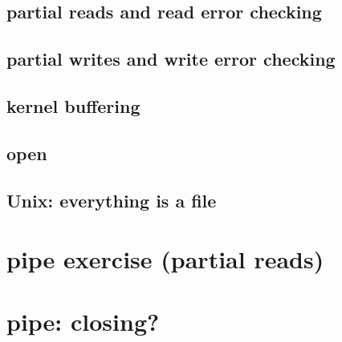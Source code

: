 \subsection{partial reads and read error checking}

\subsection{partial writes and write error checking}


\subsection{kernel buffering}



\subsection{open}


\subsection{Unix: everything is a file}



\section{pipe exercise (partial reads)}

\section{pipe: closing?}


